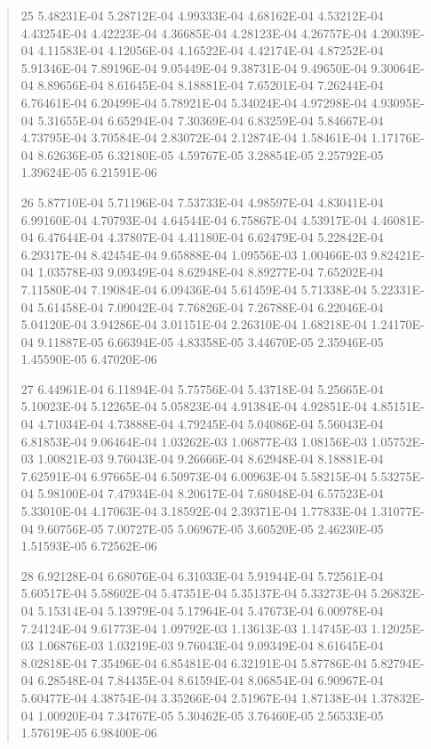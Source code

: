 \documentclass[letterpaper,10pt,english]{sphinxmanual}
\begin{document}
\begin{quote}
\begin{DUlineblock}{0em}
\item[] 25   5.48231E-04  5.28712E-04  4.99333E-04  4.68162E-04  4.53212E-04  4.43254E-04  4.42223E-04  4.36685E-04  4.28123E-04  4.26757E-04  4.20039E-04  4.11583E-04  4.12056E-04  4.16522E-04  4.42174E-04  4.87252E-04  5.91346E-04  7.89196E-04  9.05449E-04  9.38731E-04  9.49650E-04  9.30064E-04  8.89656E-04  8.61645E-04  8.18881E-04  7.65201E-04  7.26244E-04  6.76461E-04  6.20499E-04  5.78921E-04  5.34024E-04  4.97298E-04  4.93095E-04  5.31655E-04  6.65294E-04  7.30369E-04  6.83259E-04  5.84667E-04  4.73795E-04  3.70584E-04  2.83072E-04  2.12874E-04  1.58461E-04  1.17176E-04  8.62636E-05  6.32180E-05  4.59767E-05  3.28854E-05  2.25792E-05  1.39624E-05  6.21591E-06
\item[] 26   5.87710E-04  5.71196E-04  7.53733E-04  4.98597E-04  4.83041E-04  6.99160E-04  4.70793E-04  4.64544E-04  6.75867E-04  4.53917E-04  4.46081E-04  6.47644E-04  4.37807E-04  4.41180E-04  6.62479E-04  5.22842E-04  6.29317E-04  8.42454E-04  9.65888E-04  1.09556E-03  1.00466E-03  9.82421E-04  1.03578E-03  9.09349E-04  8.62948E-04  8.89277E-04  7.65202E-04  7.11580E-04  7.19084E-04  6.09436E-04  5.61459E-04  5.71338E-04  5.22331E-04  5.61458E-04  7.09042E-04  7.76826E-04  7.26788E-04  6.22046E-04  5.04120E-04  3.94286E-04  3.01151E-04  2.26310E-04  1.68218E-04  1.24170E-04  9.11887E-05  6.66394E-05  4.83358E-05  3.44670E-05  2.35946E-05  1.45590E-05  6.47020E-06
\item[] 27   6.44961E-04  6.11894E-04  5.75756E-04  5.43718E-04  5.25665E-04  5.10023E-04  5.12265E-04  5.05823E-04  4.91384E-04  4.92851E-04  4.85151E-04  4.71034E-04  4.73888E-04  4.79245E-04  5.04086E-04  5.56043E-04  6.81853E-04  9.06464E-04  1.03262E-03  1.06877E-03  1.08156E-03  1.05752E-03  1.00821E-03  9.76043E-04  9.26666E-04  8.62948E-04  8.18881E-04  7.62591E-04  6.97665E-04  6.50973E-04  6.00963E-04  5.58215E-04  5.53275E-04  5.98100E-04  7.47934E-04  8.20617E-04  7.68048E-04  6.57523E-04  5.33010E-04  4.17063E-04  3.18592E-04  2.39371E-04  1.77833E-04  1.31077E-04  9.60756E-05  7.00727E-05  5.06967E-05  3.60520E-05  2.46230E-05  1.51593E-05  6.72562E-06
\item[] 28   6.92128E-04  6.68076E-04  6.31033E-04  5.91944E-04  5.72561E-04  5.60517E-04  5.58602E-04  5.47351E-04  5.35137E-04  5.33273E-04  5.26832E-04  5.15314E-04  5.13979E-04  5.17964E-04  5.47673E-04  6.00978E-04  7.24124E-04  9.61773E-04  1.09792E-03  1.13613E-03  1.14745E-03  1.12025E-03  1.06876E-03  1.03219E-03  9.76043E-04  9.09349E-04  8.61645E-04  8.02818E-04  7.35496E-04  6.85481E-04  6.32191E-04  5.87786E-04  5.82794E-04  6.28548E-04  7.84435E-04  8.61594E-04  8.06854E-04  6.90967E-04  5.60477E-04  4.38754E-04  3.35266E-04  2.51967E-04  1.87138E-04  1.37832E-04  1.00920E-04  7.34767E-05  5.30462E-05  3.76460E-05  2.56533E-05  1.57619E-05  6.98400E-06

\end{DUlineblock}
\end{quote}
\end{document}
